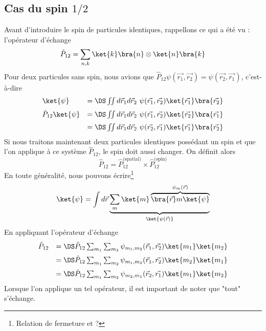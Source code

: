 \subsection{Cas du spin $1/2$}
Avant d'introduire le spin de particules identiques, rappellons ce qui a été vu : l'opérateur d'échange
\begin{equation}
\hat{P}_{12} = \sum_{n,k} \ket{k}\bra{n}\otimes\ket{n}\bra{k}
\end{equation}
Pour deux particules sans spin, nous avions que $\hat{P}_{12}\psi(\vec{r_1},\vec{r_2})=\psi(\vec{r_2},\vec{r_1})$, 
c'est-à-dire
\begin{equation}
\begin{array}{ll}
\ket{\psi} &=\DS \iint d\vec{r}_1d\vec{r}_2\ \psi(\vec{r_1},\vec{r_2})\ket{\vec{r_1}}\bra{\vec{r_2}}\vspace{2mm}\\
\hat{P}_{12}\ket{\psi}&=\DS \iint d\vec{r}_1d\vec{r}_2\ \psi(\vec{r_1},\vec{r_2})\ket{\vec{r_2}}\bra{\vec{r_1}}\vspace{2mm}\\
&=\DS \iint d\vec{r}_1d\vec{r}_2\ \psi(\vec{r_2},\vec{r_1})\ket{\vec{r_1}}\bra{\vec{r_2}}
\end{array}
\end{equation}
Si nous traitons maintenant deux particules identiques possédant un spin et que l'on applique à ce système $\hat{P}_{12}$, 
le spin doit aussi changer. On définit alors 
\begin{equation}
\hat{P}_{12} = \hat{P}_{12}^{\text{(spatial)}}\times\hat{P}_{12}^{\text{(spin)}}
\end{equation}
En toute généralité, nous pouvons écrire\footnote{Relation de fermeture et ? }
\begin{equation}
\ket{\psi} = \int d\vec{r}\underbrace{\sum_m\ket{m}\overbrace{\bra{\vec{r}}m\ket{\psi}}^{\psi_m(\vec{r})}}_{\ket{\psi(\vec{r})}}
\end{equation}
En appliquant l'opérateur d'échange
\begin{equation}
\begin{array}{ll}
\hat{P}_{12} &=\DS \hat{P}_{12} \sum_{m_1}\sum_{m_2} \psi_{m_1,m_2}(\vec{r}_1,\vec{r_2})\ket{m_1}\ket{m_2}\vspace{2mm}\\
&=\DS \hat{P}_{12} \sum_{m_1}\sum_{m_2} \psi_{m_1,m_2}(\vec{r}_1,\vec{r_2})\ket{m_2}\ket{m_1}\vspace{2mm}\\
&=\DS \hat{P}_{12} \sum_{m_1}\sum_{m_2} \psi_{m_2,m_1}(\vec{r}_2,\vec{r_1})\ket{m_1}\ket{m_2}
\end{array}
\end{equation}
Lorsque l'on applique un tel opérateur, il est important de noter que "tout" s'échange.

